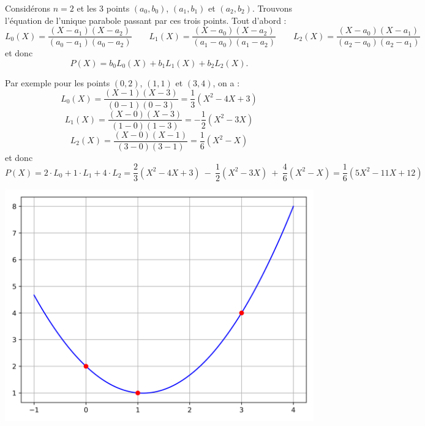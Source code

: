 \documentclass[11pt,class=report,crop=false]{standalone}
\begin{document}
\begin{exemple}
Considérons $n=2$ et les $3$ points $(a_0,b_0)$, $(a_1,b_1)$ et $(a_2,b_2)$.
Trouvons l'équation de l'unique parabole passant par ces trois points. 
Tout d'abord :
$$L_0(X) = \frac{(X-a_1)(X-a_2)}{(a_0-a_1)(a_0-a_2)} \qquad L_1(X) = \frac{(X-a_0)(X-a_2)}{(a_1-a_0)(a_1-a_2)} \qquad L_2(X) = \frac{(X-a_0)(X-a_1)}{(a_2-a_0)(a_2-a_1)}$$
et donc
$$P(X) = b_0 L_0(X) + b_1 L_1(X) + b_2 L_2(X).$$

Par exemple pour les points $(0,2)$, $(1,1)$ et $(3,4)$, on a :
$$L_0(X) = \frac{(X-1)(X-3)}{(0-1)(0-3)} = \frac{1}{3}(X^2-4X+3)$$
$$L_1(X) = \frac{(X-0)(X-3)}{(1-0)(1-3)} = -\frac{1}{2}(X^2-3X)$$
$$L_2(X) = \frac{(X-0)(X-1)}{(3-0)(3-1)} = \frac{1}{6}(X^2-X)$$
et donc
$$P(X) 
= 2 \cdot L_0 + 1 \cdot L_1 + 4 \cdot L_2
= \frac{2}{3}(X^2-4X+3) \ - \ \frac{1}{2}(X^2-3X) \  + \  \frac{4}{6}(X^2-X)
= \frac16(5X^2-11X+12)$$

\begin{center}
  \includegraphics[scale=\myscale,scale=0.5]{figures/approx-lagrange-02}
\end{center}

\end{exemple}
\end{document}
